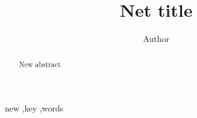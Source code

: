 
\title{Net title
}

\author[label1]{Author}
\address[label1]{ZJU}
\begin{abstract}
New abstract


\end{abstract}

\begin{keyword}
new \sep key \sep words
\end{keyword}